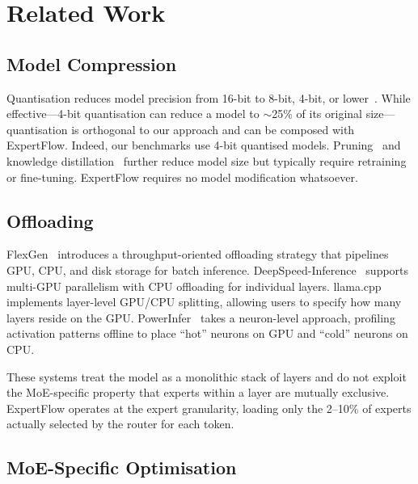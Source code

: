 \documentclass[11pt,a4paper]{article}
\begin{document}
\section{Related Work}
\label{sec:related}

\subsection{Model Compression}
\label{sec:related:compression}

Quantisation reduces model precision from 16-bit to 8-bit, 4-bit, or
lower~\citep{dettmers2022gptint8, frantar2023gptq, lin2024awq,
dettmers2023qlora}. While effective---4-bit quantisation can reduce a model to
$\sim$25\% of its original size---quantisation is orthogonal to our approach
and can be composed with ExpertFlow. Indeed, our benchmarks use 4-bit
quantised models. Pruning~\citep{frantar2023sparsegpt, sun2023wanda} and
knowledge distillation~\citep{hinton2015distilling, gu2024minillm} further
reduce model size but typically require retraining or fine-tuning. ExpertFlow
requires no model modification whatsoever.

\subsection{Offloading}
\label{sec:related:offloading}

FlexGen~\citep{sheng2023flexgen} introduces a throughput-oriented offloading
strategy that pipelines GPU, CPU, and disk storage for batch inference.
DeepSpeed-Inference~\citep{aminabadi2022deepspeed} supports multi-GPU
parallelism with CPU offloading for individual layers.
llama.cpp~\citep{gerganov2023llamacpp} implements layer-level GPU/CPU
splitting, allowing users to specify how many layers reside on the GPU.
PowerInfer~\citep{song2023powerinfer} takes a neuron-level approach, profiling
activation patterns offline to place ``hot'' neurons on GPU and ``cold''
neurons on CPU.

These systems treat the model as a monolithic stack of layers and do not
exploit the MoE-specific property that experts within a layer are mutually
exclusive. ExpertFlow operates at the expert granularity, loading only the
2--10\% of experts actually selected by the router for each token.

\subsection{MoE-Specific Optimisation}
\label{sec:related:moe}
\end{document}

